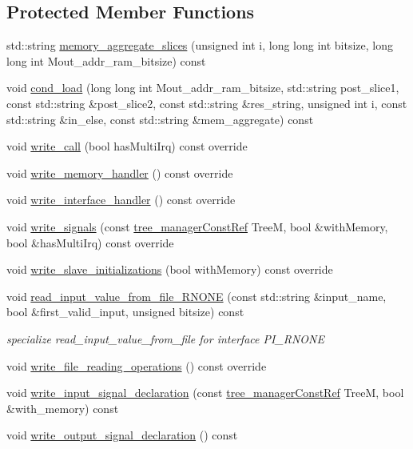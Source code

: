 \subsection*{Protected Member Functions}
\begin{DoxyCompactItemize}
\item 
std\+::string \hyperlink{classMinimalInterfaceTestbench_ade0c8242d6dadb2937939d9b31d12831}{memory\+\_\+aggregate\+\_\+slices} (unsigned int i, long long int bitsize, long long int Mout\+\_\+addr\+\_\+ram\+\_\+bitsize) const
\item 
void \hyperlink{classMinimalInterfaceTestbench_a47fd2d6db6d166a24bebbe721856c5c1}{cond\+\_\+load} (long long int Mout\+\_\+addr\+\_\+ram\+\_\+bitsize, std\+::string post\+\_\+slice1, const std\+::string \&post\+\_\+slice2, const std\+::string \&res\+\_\+string, unsigned int i, const std\+::string \&in\+\_\+else, const std\+::string \&mem\+\_\+aggregate) const
\item 
void \hyperlink{classMinimalInterfaceTestbench_a646e461dfe469649ac2f67a7dac554b9}{write\+\_\+call} (bool has\+Multi\+Irq) const override
\item 
void \hyperlink{classMinimalInterfaceTestbench_a7dd0527a7925eb55406a3db09adecf99}{write\+\_\+memory\+\_\+handler} () const override
\item 
void \hyperlink{classMinimalInterfaceTestbench_ab1139a5ae11ad46d2be19713199cb9e1}{write\+\_\+interface\+\_\+handler} () const override
\item 
void \hyperlink{classMinimalInterfaceTestbench_ae769d22c64fd7d99cbfb435881cc0fc0}{write\+\_\+signals} (const \hyperlink{tree__manager_8hpp_a792e3f1f892d7d997a8d8a4a12e39346}{tree\+\_\+manager\+Const\+Ref} TreeM, bool \&with\+Memory, bool \&has\+Multi\+Irq) const override
\item 
void \hyperlink{classMinimalInterfaceTestbench_a1bf1863909ba155e241745c78f6e3c03}{write\+\_\+slave\+\_\+initializations} (bool with\+Memory) const override
\item 
void \hyperlink{classMinimalInterfaceTestbench_ad133b062afb651685cf860a0b218d330}{read\+\_\+input\+\_\+value\+\_\+from\+\_\+file\+\_\+\+R\+N\+O\+NE} (const std\+::string \&input\+\_\+name, bool \&first\+\_\+valid\+\_\+input, unsigned bitsize) const
\begin{DoxyCompactList}\small\item\em specialize read\+\_\+input\+\_\+value\+\_\+from\+\_\+file for interface P\+I\+\_\+\+R\+N\+O\+NE \end{DoxyCompactList}\item 
void \hyperlink{classMinimalInterfaceTestbench_a017c01898d65736dccd9531a81151283}{write\+\_\+file\+\_\+reading\+\_\+operations} () const override
\item 
void \hyperlink{classMinimalInterfaceTestbench_ad98da27cdbef628638bae4f61ce36cc7}{write\+\_\+input\+\_\+signal\+\_\+declaration} (const \hyperlink{tree__manager_8hpp_a792e3f1f892d7d997a8d8a4a12e39346}{tree\+\_\+manager\+Const\+Ref} TreeM, bool \&with\+\_\+memory) const
\item 
void \hyperlink{classMinimalInterfaceTestbench_a491e3de9b0dd7e94c304f15211d939e7}{write\+\_\+output\+\_\+signal\+\_\+declaration} () const
\end{DoxyCompactItemize}
